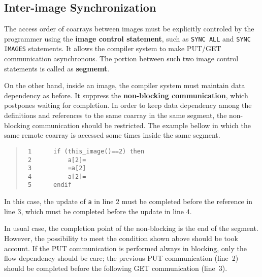 

\subsection{Inter-image Synchronization}\label{spec-sync}

The access order of coarrays between images must be explicitly controled by the 
programmer using the {\bf image control statement}, 
such as {\tt SYNC ALL} and {\tt SYNC IMAGES} statements. 
It allows the compiler system to make PUT/GET communication asynchronous.
The portion between such two image control statements is called as {\bf segmemt}.

On the other hand, inside an image, the compiler system must maintain data 
dependency as before. It suppress the {\bf non-blocking communication},
which postpones waiting for completion.
In order to keep data dependency among the definitions and references to the same 
coarray in the same segment, the non-blocking communication should be restricted.
The example bellow in which the same remote coarray is accessed some times 
inside the same segment.
\begin{quote}
\begin{verbatim}
 1      if (this_image()==2) then
 2          a[2]=
 3          =a[2]
 4          a[2]=
 5      endif
\end{verbatim}
\end{quote}
In this case, the update of {\tt a} in line 2 must be completed before 
the reference in line 3, which must be completed before the update in line 4.


\requirement
In usual case, the completion point of the non-blocking is the end of the segment.
However, the possibility to meet the condition shown above should 
be took account. If the PUT communication is performed always in blocking, 
only the flow dependency should be care; the previous PUT communication (line~2) 
should be completed before the following GET communication (line~3).


